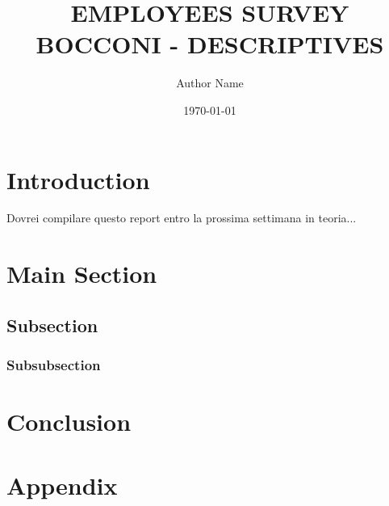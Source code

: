 \documentclass[12pt]{article}
\title{EMPLOYEES SURVEY BOCCONI - DESCRIPTIVES}
\author{Author Name}
\date{\today}
\numberwithin{figure}{section}
\numberwithin{table}{section}
\begin{document}
\maketitle


\section{Introduction}
Dovrei compilare questo report entro la prossima settimana in teoria...

\section{Main Section}



\subsection{Subsection}
\blindtext

\subsubsection{Subsubsection}
\blindtext

\section{Conclusion}
\blindtext


\appendix
\section*{Appendix}





\end{document}

